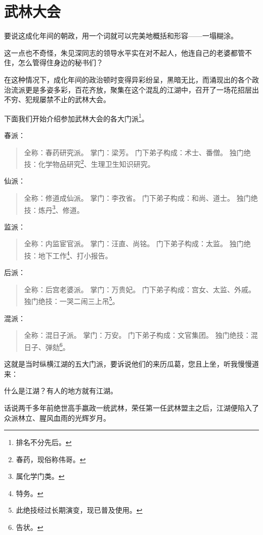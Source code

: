 \section{武林大会}
\ifnum{}
	\begin{multicols}{\theparacolNo}
\fi
要说这成化年间的朝政，用一个词就可以完美地概括和形容——一塌糊涂。

这一点也不奇怪，朱见深同志的领导水平实在对不起人，他连自己的老婆都管不住，怎么管得住身边的秘书们？

在这种情况下，成化年间的政治顿时变得异彩纷呈，黑暗无比，而涌现出的各个政治流派更是多姿多彩，百花齐放，聚集在这个混乱的江湖中，召开了一场花招层出不穷、犯规屡禁不止的武林大会。

下面我们开始介绍参加武林大会的各大门派\footnote{排名不分先后。}。

春派：
{\footnotesize \begin{quote}
	全称：春药研究派。
	掌门：梁芳。
	门下弟子构成：术士、番僧。
	独门绝技：化学物品研究\footnote{春药，现俗称伟哥。}、生理卫生知识研究。
\end{quote}}

仙派：
{\footnotesize \begin{quote}
	全称：修道成仙派。
	掌门：李孜省。
	门下弟子构成：和尚、道士。
	独门绝技：炼丹\footnote{属化学门类。}、修道。
\end{quote}}

监派：
{\footnotesize \begin{quote}
	全称：内监宦官派。
	掌门：汪直、尚铭。
	门下弟子构成：太监。
	独门绝技：地下工作\footnote{特务。}、打小报告。
\end{quote}}

后派：
{\footnotesize \begin{quote}
	全称：后宫老婆派。
	掌门：万贵妃。
	门下弟子构成：宫女、太监、外戚。
	独门绝技：一哭二闹三上吊\footnote{此绝技经过长期演变，现已普及使用。}。
\end{quote}}

混派：
{\footnotesize \begin{quote}
	全称：混日子派。
	掌门：万安。
	门下弟子构成：文官集团。
	独门绝技：混日子、弹劾\footnote{告状。}。
\end{quote}}

这就是当时纵横江湖的五大门派，要诉说他们的来历瓜葛，您且上坐，听我慢慢道来：

什么是江湖？有人的地方就有江湖。

话说两千多年前绝世高手嬴政一统武林，荣任第一任武林盟主之后，江湖便陷入了众派林立、腥风血雨的光辉岁月。


\end{multicols}
